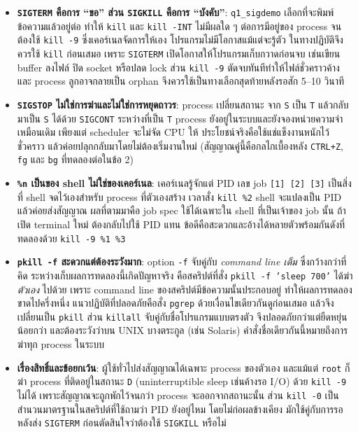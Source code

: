 \documentclass[a4paper,11pt]{article}
\newcommand{\code}[1]{\texttt{#1}}
\begin{document}
\begin{itemize}[leftmargin=*]
  \item \textbf{\code{SIGTERM} คือการ ``ขอ'' ส่วน \code{SIGKILL} คือการ ``บังคับ''}:
        \code{q1\_sigdemo} เลือกที่จะพิมพ์ข้อความแล้วอยู่ต่อ ทำให้ \code{kill}
        และ \code{kill -INT} ไม่มีผลใด ๆ ต่อการมีอยู่ของ process จนต้องใช้
        \code{kill -9} ซึ่งเคอร์เนลจัดการให้เอง โปรแกรมไม่มีโอกาสแม้แต่จะรู้ตัว
        ในทางปฏิบัติจึงควรใช้ \code{kill} ก่อนเสมอ เพราะ \code{SIGTERM}
        เปิดโอกาสให้โปรแกรมเก็บกวาดก่อนจบ เช่นเขียน buffer ลงไฟล์ ปิด socket
        หรือปลด lock ส่วน \code{kill -9} ตัดจบทันทีทำให้ไฟล์ชั่วคราวค้างและ
        process ลูกอาจกลายเป็น orphan จึงควรใช้เป็นทางเลือกสุดท้ายหลังรอสัก 5--10 วินาที

  \item \textbf{\code{SIGSTOP} ไม่ใช่การฆ่าและไม่ใช่การหยุดถาวร}: process เปลี่ยนสถานะ
        จาก \code{S} เป็น \code{T} แล้วกลับมาเป็น \code{S} ได้ด้วย \code{SIGCONT}
        ระหว่างที่เป็น \code{T} process ยังอยู่ในระบบและยังจองหน่วยความจำเหมือนเดิม
        เพียงแต่ scheduler จะไม่จัด CPU ให้ ประโยชน์จริงคือใช้แช่แข็งงานหนักไว้ชั่วคราว
        แล้วค่อยปลุกกลับมาโดยไม่ต้องเริ่มงานใหม่ (สัญญาณคู่นี้คือกลไกเบื้องหลัง
        \code{CTRL+Z}, \code{fg} และ \code{bg} ที่ทดลองต่อในข้อ 2)

  \item \textbf{\code{\%n} เป็นของ shell ไม่ใช่ของเคอร์เนล}: เคอร์เนลรู้จักแต่ PID
        เลข job \code{[1] [2] [3]} เป็นสิ่งที่ shell จดไว้เองสำหรับ process ที่ตัวเองสร้าง
        เวลาสั่ง \code{kill \%2} shell จะแปลงเป็น PID แล้วค่อยส่งสัญญาณ ผลที่ตามมาคือ
        job spec ใช้ได้เฉพาะใน shell ที่เป็นเจ้าของ job นั้น ถ้าเปิด terminal ใหม่
        ต้องกลับไปใช้ PID แทน ข้อดีคือสะดวกและอ้างได้หลายตัวพร้อมกันดังที่ทดลองด้วย
        \code{kill -9 \%1 \%3}

  \item \textbf{\code{pkill -f} สะดวกแต่ต้องระวังมาก}: option \code{-f} จับคู่กับ
        \emph{command line เต็ม} ซึ่งกว้างกว่าที่คิด ระหว่างเก็บผลการทดลองนี้เกิดปัญหาจริง
        คือสคริปต์ที่สั่ง \code{pkill -f 'sleep 700'} ได้ฆ่า \emph{ตัวเอง} ไปด้วย
        เพราะ command line ของสคริปต์มีข้อความนั้นประกอบอยู่ ทำให้ผลการทดลองขาดไปครึ่งหนึ่ง
        แนวปฏิบัติที่ปลอดภัยคือสั่ง \code{pgrep} ด้วยเงื่อนไขเดียวกันดูก่อนเสมอ
        แล้วจึงเปลี่ยนเป็น \code{pkill} ส่วน \code{killall} จับคู่กับชื่อโปรแกรมแบบตรงตัว
        จึงปลอดภัยกว่าแต่ยืดหยุ่นน้อยกว่า และต้องระวังว่าบน UNIX บางตระกูล
        (เช่น Solaris) คำสั่งชื่อเดียวกันนี้หมายถึงการฆ่าทุก process ในระบบ

  \item \textbf{เรื่องสิทธิ์และข้อยกเว้น}: ผู้ใช้ทั่วไปส่งสัญญาณได้เฉพาะ process ของตัวเอง
        และแม้แต่ \code{root} ก็ฆ่า process ที่ติดอยู่ในสถานะ \code{D}
        (uninterruptible sleep เช่นค้างรอ I/O) ด้วย \code{kill -9} ไม่ได้
        เพราะสัญญาณจะถูกพักไว้จนกว่า process จะออกจากสถานะนั้น
        ส่วน \code{kill -0} เป็นสำนวนมาตรฐานในสคริปต์ที่ใช้ถามว่า PID ยังอยู่ไหม
        โดยไม่ก่อผลข้างเคียง มักใช้คู่กับการรอหลังส่ง \code{SIGTERM}
        ก่อนตัดสินใจว่าต้องใช้ \code{SIGKILL} หรือไม่
\end{itemize}
\end{document}
